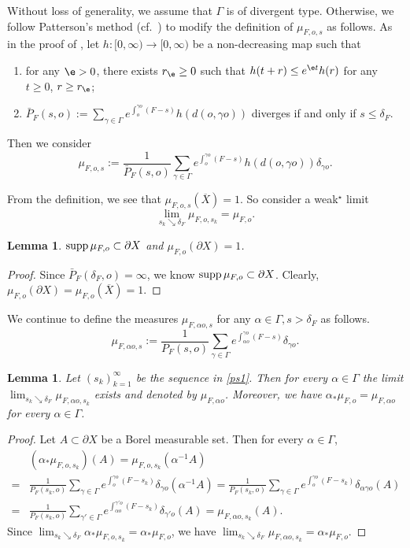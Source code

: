 \documentclass[11pt]{amsart}
\newtheorem{lemma}[theorem]{Lemma}
\theoremstyle{definition}
\def\pX{{\partial X}}
\def\supp{\mathop{\hbox{{\rm supp}}}}
\def\supp{\mathop{\hbox{{\rm supp}}}}
\def\a{\alpha}
\def\c{\gamma}   \def\C{\Gamma}
\def\d{\delta}   %
\begin{document}
Without loss of generality, we assume that $\Gamma$ is of divergent type.
Otherwise, we follow Patterson's  method (cf.~\cite{Pat}) to modify the definition of $\mu_{F,o,s}$ as follows.
As in the  proof of \cite[Proposition 3.9]{PPS}, let $h:[0,\infty)\to [0,\infty)$ be a non-decreasing map such that
\begin{enumerate}
  \item for any $\e>0$, there exists $r_\e\geq 0$ such that $h(t+r)\le e^{\e t}h(r)$ for any $t\ge 0$, $r\ge r_\e$;
  \item $\bar{P}_F(s,o):= \sum_{\c \in \Gamma}e^{\int_o^{\c o}(F-s)}h(d(o,\c o))$ diverges if and only if $s\le \d_F$.
\end{enumerate}
Then we consider
$$\mu_{F,o,s}:=\frac{1}{\bar P_F(s,o)}\sum_{\c \in \Gamma}e^{\int_o^{\gamma o}(F-s)}h(d(o,\c o))\delta_{\c o}.$$

From the definition, we see that $\mu_{F,o,s}(\overline{X})=1$. So consider a weak$^{\star}$ limit
\begin{equation}\label{ps1}
  \lim_{s_{k}\searrow \d_F}\mu_{F, o, s_{k}}=\mu_{F,o}.  
\end{equation}
\begin{lemma}
$\supp\mu_{F,o}\subset \pX$ and $\mu_{F,o}(\pX)=1$.
\end{lemma}
\begin{proof}
Since $\bar P_F(\d_F, o)=\infty$, we know $\supp\mu_{F,o}\subset \pX$. Clearly, $\mu_{F,o}(\pX)=\mu_{F,o}(\overline{X})=1$.
\end{proof}

We continue to define the measures $\mu_{F, \a o,s}$ for any $\a\in\C, s>\d_F$ as follows.
$$\mu_{F,\a o,s}:=\frac{1}{P_F(s,o)}\sum_{\c \in \Gamma}e^{\int_{\a o}^{\c o}(F-s)}\delta_{\c o}.$$
\begin{lemma}\label{equiv}
Let $(s_k)_{k=1}^\infty$ be the sequence in \eqref{ps1}. Then for every $\a\in \Gamma$ the limit
$\lim_{s_{k}\searrow \d_F}\mu_{F, \a o, s_{k}}$
exists and denoted by $\mu_{F, \a o}$. Moreover, we have $\a_*\mu_{F,o}=\mu_{F, \a o}$ for every $\a\in \Gamma$.
\end{lemma}
\begin{proof}
Let $A\subset \pX$ be a Borel measurable set. Then for every $\a\in \Gamma$,
\begin{equation*}
    \begin{aligned}
&(\a_*\mu_{F,o,s_k})(A)=\mu_{F,o,s_k}(\a^{-1}A)\\
=&\frac{1}{P_F(s_k,o)}\sum_{\c \in \Gamma}e^{\int_o^{\gamma o}(F-s_k)}\delta_{\c o}(\a^{-1}A)=\frac{1}{P_F(s_k,o)}\sum_{\c \in \Gamma}e^{\int_o^{\gamma o}(F-s_k)}\delta_{\a \c o}(A)\\
=&\frac{1}{P_F(s_k,o)}\sum_{\c' \in \Gamma}e^{\int_{\a o}^{\gamma' o}(F-s_k)}\delta_{\c' o}(A)=\mu_{F,\a o,s_k}(A).
    \end{aligned}
\end{equation*}
Since  $\lim_{s_{k}\searrow \d_F}\a_*\mu_{F,o,s_k}=\a_*\mu_{F,o}$, we have $\lim_{s_{k}\searrow \d_F}\mu_{F,\a o,s_k}=\a_*\mu_{F,o}$.
\end{proof}
\end{document}
